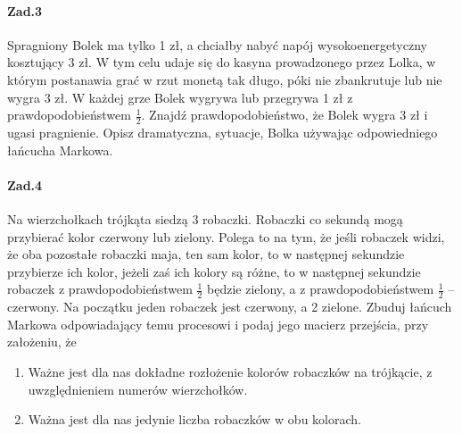\paragraph{Zad.3} Spragniony Bolek ma tylko 1 zł, a chciałby nabyć napój wysokoenergetyczny kosztujący 3 zł. W tym celu udaje się do kasyna prowadzonego przez Lolka, w którym postanawia grać w rzut monetą tak długo, póki nie zbankrutuje lub nie wygra 3 zł. W każdej grze Bolek wygrywa lub przegrywa 1 zł z prawdopodobieństwem $\frac{1}{2}$. Znajdź prawdopodobieństwo, że Bolek wygra 3 zł i ugasi pragnienie. Opisz dramatyczna, sytuacje, Bolka używając odpowiedniego łańcucha Markowa.

\paragraph{Zad.4} Na wierzchołkach trójkąta siedzą 3 robaczki. Robaczki co sekundą mogą przybierać kolor czerwony lub zielony. Polega to na tym, że jeśli robaczek widzi, że oba pozostałe robaczki maja, ten sam kolor, to w następnej sekundzie przybierze ich kolor, jeżeli zaś ich kolory są różne, to w następnej sekundzie robaczek z prawdopodobieństwem $\frac{1}{2}$ będzie zielony, a z prawdopodobieństwem $\frac{1}{2}$ – czerwony. Na początku jeden robaczek jest czerwony, a 2 zielone. Zbuduj łańcuch Markowa odpowiadający temu procesowi i podaj jego macierz przejścia, przy założeniu, że
\begin{enumerate}[label=\alph*)]
\item Ważne jest dla nas dokładne rozłożenie kolorów robaczków na trójkącie, z uwzględnieniem numerów wierzchołków.
\item Ważna jest dla nas jedynie liczba robaczków w obu kolorach.
\end{enumerate}

